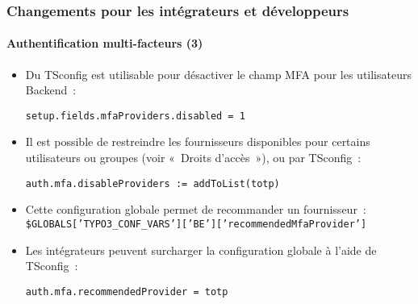 %

\begin{frame}[fragile]
	\frametitle{Changements pour les intégrateurs et développeurs}
	\framesubtitle{Authentification multi-facteurs (3)}


	\begin{itemize}
		\item Du TSconfig est utilisable pour désactiver le champ MFA pour les utilisateurs Backend~:
\begin{lstlisting}
setup.fields.mfaProviders.disabled = 1
\end{lstlisting}

		\item Il est possible de restreindre les fournisseurs disponibles pour certains utilisateurs
			ou groupes (voir «~Droits d'accès~»), ou par TSconfig~:
\begin{lstlisting}
auth.mfa.disableProviders := addToList(totp)
\end{lstlisting}

		\item Cette configuration globale permet de recommander un fournisseur~:\newline
			\smaller\texttt{\$GLOBALS['TYPO3\_CONF\_VARS']['BE']['recommendedMfaProvider']}\normalsize

		\item Les intégrateurs peuvent surcharger la configuration globale à l'aide de TSconfig~:
\begin{lstlisting}
auth.mfa.recommendedProvider = totp
\end{lstlisting}

	\end{itemize}

\end{frame}

